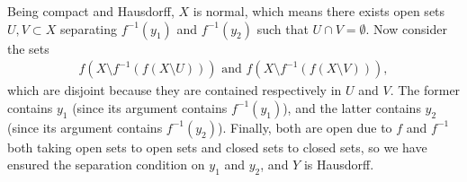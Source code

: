 \documentclass[a4paper,12pt]{article}
\begin{document}
\begin{enumerate}
        Being compact and Hausdorff, $X$ is normal, which means there exists open sets $U, V \subset X$ separating $f^{-1}(y_1)$ and $f^{-1}(y_2)$ such that $U \cap V = \emptyset$. Now consider the sets
        \begin{align*}
            f(X \setminus f^{-1}(f(X \setminus U))) \text{ and } f(X \setminus f^{-1}(f(X \setminus V))),
        \end{align*}
        which are disjoint because they are contained respectively in $U$ and $V$. The former contains $y_1$ (since its argument contains $f^{-1}(y_1)$), and the latter contains $y_2$ (since its argument contains $f^{-1}(y_2)$). Finally, both are open due to $f$ and $f^{-1}$ both taking open sets to open sets and closed sets to closed sets, so we have ensured the separation condition on $y_1$ and $y_2$, and $Y$ is Hausdorff.
\end{enumerate}
\end{document}
